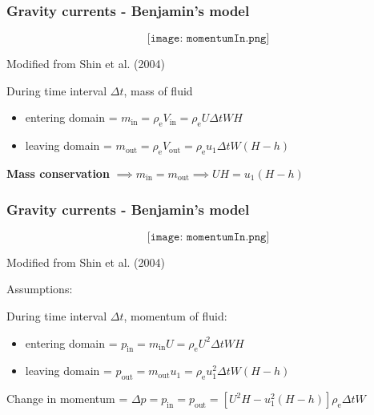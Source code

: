 \documentclass{beamer}
\begin{document}
\begin{frame}
  \frametitle{Gravity currents - Benjamin's model}

  $$\texttt{[image: momentumIn.png]}$$

  \vspace{-0.75cm}

  \begin{center}
  \tiny Modified from Shin et al. (2004)
  \end{center}

  During time interval $\Delta t$, mass of fluid

  \begin{itemize}
  \item entering domain = $ m_{\text{in}} = \rho_{\text{e}} V_{\text{in}} = \rho_{\text{e}} U \Delta t W H$ \\
  \item leaving domain = $ m_{\text{out}} = \rho_{\text{e}} V_{\text{out}} = \rho_{\text{e}} u_{1} \Delta t W (H - h)$ \\
  \end{itemize}

  \textbf{Mass conservation} $\implies m_{\text{in}} = m_{\text{out}} \implies U H = u_{1} (H - h)$
\end{frame}
\begin{frame}
  \frametitle{Gravity currents - Benjamin's model}

  $$\texttt{[image: momentumIn.png]}$$

  \vspace{-0.75cm}

  \begin{center}
  \tiny Modified from Shin et al. (2004)
  \end{center}
  \normalsize Assumptions:

  During time interval $\Delta t$, momentum of fluid:

  \begin{itemize}
  \item entering domain = $ p_{\text{in}} = m_{\text{in}} U = \rho_{\text{e}} U^{2} \Delta t W H$ \\
  \item leaving domain = $ p_{\text{out}} = m_{\text{out}} u_{1} = \rho_{\text{e}} u_{1}^{2} \Delta t W (H - h)$ \\
  \end{itemize}

  Change in momentum = $\Delta p = p_{\text{in}} = p_{\text{out}} = [U^{2} H - u_{1}^{2} (H - h)] \rho_{\text{e}} \Delta t W $
\end{frame}
\end{document}
